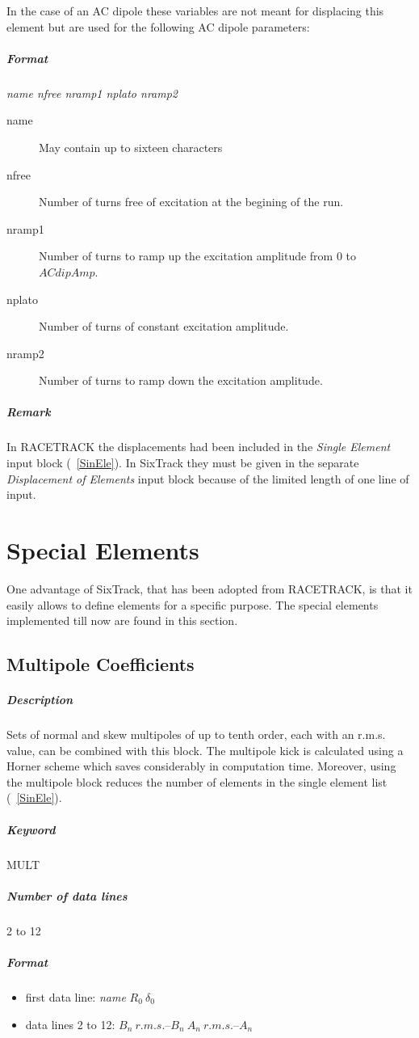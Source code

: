\documentclass[a4paper,11pt]{report}
\begin{document}
In the case of an AC dipole these variables are not meant for
displacing this element but are used for the following AC dipole
parameters:
\subparagraph{Format} {\em name nfree nramp1 nplato nramp2}
\begin{description}
\item [name] May contain up to sixteen characters
\item [nfree] Number of turns free of excitation at the begining of
  the run.
\item [nramp1] Number of turns to ramp up the excitation amplitude 
  from 0 to $ACdipAmp$.
\item [nplato] Number of turns of constant excitation amplitude. 
\item [nramp2] Number of turns to ramp down the excitation amplitude.
\end{description}

\subparagraph{Remark} In RACETRACK the displacements had been included
in the {\em Single Element} \/input block (~\ref{SinEle}). In SixTrack
they must be given in the separate {\em Displacement of Elements}
\/input block because of the limited length of one line of input.

\section{Special Elements}

One advantage of SixTrack, that has been adopted from RACETRACK, is
that it easily allows to define elements for a specific purpose. The
special elements implemented till now are found in this section.

\subsection{Multipole Coefficients} \label{MulCoe}

\subparagraph{Description}

Sets of normal and skew multipoles of up to tenth order, each with an
r.m.s. value, can be combined with this block. The multipole kick is
calculated using a Horner scheme which saves considerably in
computation time. Moreover, using the multipole block reduces the
number of elements in the single element list (~\ref{SinEle}).

\subparagraph{Keyword} MULT \subparagraph{Number of data lines} 2 to
12

\subparagraph{Format}
\begin{itemize}
\item first data line: {\em name} \/$ R_{0}\ \delta_{0} $
\item data lines 2 to 12: $ B_{n}\ r.m.s.$--$B_{n}\ A_{n}\ r.m.s.$--$A_{n} $
\end{itemize}
\end{document}

